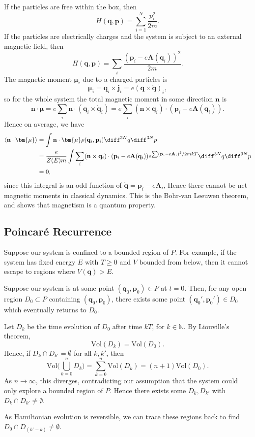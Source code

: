 \documentclass[12pt]{article}
\begin{document}
If the particles are free within the box, then
\[
H(\mathbf{q}, \mathbf{p}) = \sum_{i = 1}^{N} \frac{p_i^2}{2m}.
\]
If the particles are electrically charges and the system is subject to an external magnetic field, then
\[
H(\mathbf{q}, \mathbf{p}) = \sum_i \frac{(\mathbf{p}_i - e \mathbf{A}(\mathbf{q}_i))^2}{2m}.
\]
The magnetic moment $\bm{\mu}_i$ due to a charged particles is
\[
\bm{\mu}_i = \mathbf{q}_i \times \mathbf{j}_i = e (\mathbf{q} \times \mathbf{\dot q})_i,
\]
so for the whole system the total magnetic moment in some direction $\mathbf{n}$ is
\[
\mathbf{n} \cdot \bm{\mu} = e \sum_i \mathbf{n} \cdot (\mathbf{q}_i \times \mathbf{\dot q}_i) = e \sum_i (\mathbf{n} \times \mathbf{q}_i) \cdot (\mathbf{p}_i - e \mathbf{A}(\mathbf{q}_i)).
\]
Hence on average, we have
\begin{align*}
	\langle \mathbf{n} \cdot \bm{\mu} \rangle &= \int \mathbf{n} \cdot \bm{\mu} \rho(\mathbf{q}_i, \mathbf{p}_i) \diff^{3N} q \diff^{3N} p \\
						  &= \frac{e}{Z(E) m} \int \sum_i (\mathbf{n} \times \mathbf{q}_i) \cdot (\mathbf{p}_i - e \mathbf{A}(\mathbf{q}_i)) e^{\sum (\mathbf{p}_i - e \mathbf{A}_i)^2/2mkT} \diff^{3N} q \diff^{3N} p \\
						  &= 0,
\end{align*}
since this integral is an odd function of $\mathbf{\dot q} = \mathbf{p}_i - e \mathbf{A}_i$, Hence there cannot be net magnetic moments in classical dynamics. This is the Bohr-van Leeuwen theorem, and shows that magnetism is a quantum property.

\subsection{Poincar\'e Recurrence}
\label{sub:pc_recur}

Suppose our system is confined to a bounded region of $P$. For example, if the system has fixed energy $E$ with $T \geq 0$ and $V$ bounded from below, then it cannot escape to regions where $V(\mathbf{q}) > E$.

Suppose our system is at some point $(\mathbf{q}_0, \mathbf{p}_0) \in P$ at $t = 0$. Then, for any open region $D_0 \subset P$ containing $(\mathbf{q}_0, \mathbf{p}_0)$, there exists some point $(\mathbf{q}_0', \mathbf{p}_0') \in D_0$ which eventually returns to $D_0$.

\begin{proofbox}
	Let $D_k$ be the time evolution of $D_0$ after time $kT$, for $k \in \mathbb{N}$. By Liouville's theorem,
	\[
	\mathrm{Vol}(D_k) = \mathrm{Vol}(D_0).
	\]
	Hence, if $D_k \cap D_{k'} = \emptyset$ for all $k, k'$, then
	\[
	\mathrm{Vol} \Biggl( \bigcup_{k = 0}^{n} D_k \Biggr) = \sum_{k = 0}^{n} \mathrm{Vol}(D_k) = (n+1) \mathrm{Vol}(D_0).
	\]
	As $n \to \infty$, this diverges, contradicting our assumption that the system could only explore a bounded region of $P$. Hence there exists some $D_k, D_{k'}$ with $D_k \cap D_{k'} \neq \emptyset$.

	As Hamiltonian evolution is reversible, we can trace these regions back to find $D_0 \cap D_{(k' - k)} \neq \emptyset$.
\end{proofbox}
\end{document}
